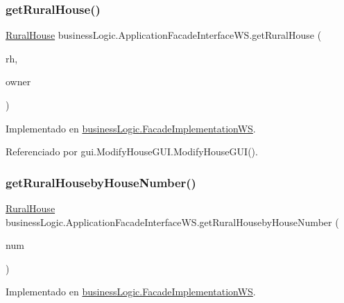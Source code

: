 \subsubsection{\texorpdfstring{getRuralHouse()}{getRuralHouse()}}
{\footnotesize\ttfamily \mbox{\hyperlink{classdomain_1_1_rural_house}{Rural\+House}} business\+Logic.\+Application\+Facade\+Interface\+W\+S.\+get\+Rural\+House (\begin{DoxyParamCaption}\item[{\mbox{\hyperlink{classdomain_1_1_rural_house}{Rural\+House}}}]{rh,  }\item[{\mbox{\hyperlink{classdomain_1_1_owner}{Owner}}}]{owner }\end{DoxyParamCaption})}



Implementado en \mbox{\hyperlink{classbusiness_logic_1_1_facade_implementation_w_s_a22945417275898b39f1fcbdd8961b1cf}{business\+Logic.\+Facade\+Implementation\+WS}}.



Referenciado por gui.\+Modify\+House\+G\+U\+I.\+Modify\+House\+G\+U\+I().

\mbox{\label{interfacebusiness_logic_1_1_application_facade_interface_w_s_a686ca441b89f52085ef66d00f10c6854}} 
\subsubsection{\texorpdfstring{getRuralHousebyHouseNumber()}{getRuralHousebyHouseNumber()}}
{\footnotesize\ttfamily \mbox{\hyperlink{classdomain_1_1_rural_house}{Rural\+House}} business\+Logic.\+Application\+Facade\+Interface\+W\+S.\+get\+Rural\+Houseby\+House\+Number (\begin{DoxyParamCaption}\item[{int}]{num }\end{DoxyParamCaption})}



Implementado en \mbox{\hyperlink{classbusiness_logic_1_1_facade_implementation_w_s_a4b08e36f8de023cb541f63a5e772e2be}{business\+Logic.\+Facade\+Implementation\+WS}}.



